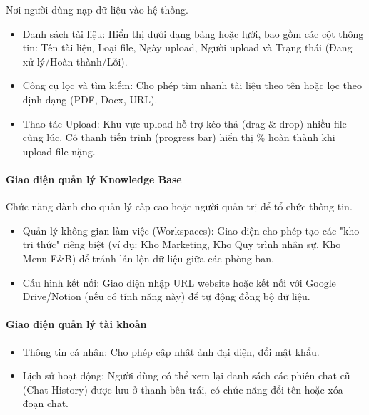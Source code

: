 Nơi người dùng nạp dữ liệu vào hệ thống.

\begin{itemize}
\item
  Danh sách tài liệu: Hiển thị dưới dạng bảng hoặc lưới, bao gồm các cột
  thông tin: Tên tài liệu, Loại file, Ngày upload, Người upload và Trạng
  thái (Đang xử lý/Hoàn thành/Lỗi).
\item
  Công cụ lọc và tìm kiếm: Cho phép tìm nhanh tài liệu theo tên hoặc lọc
  theo định dạng (PDF, Docx, URL).
\item
  Thao tác Upload: Khu vực upload hỗ trợ kéo-thả (drag \& drop) nhiều
  file cùng lúc. Có thanh tiến trình (progress bar) hiển thị \% hoàn
  thành khi upload file nặng.
\end{itemize}

\paragraph{Giao diện quản lý Knowledge
Base}\label{giao-diux1ec7n-quux1ea3n-luxfd-knowledge-base}

Chức năng dành cho quản lý cấp cao hoặc người quản trị để tổ chức thông
tin.

\begin{itemize}
\item
  Quản lý không gian làm việc (Workspaces): Giao diện cho phép tạo các
  "kho tri thức" riêng biệt (ví dụ: Kho Marketing, Kho Quy trình nhân
  sự, Kho Menu F\&B) để tránh lẫn lộn dữ liệu giữa các phòng ban.
\item
  Cấu hình kết nối: Giao diện nhập URL website hoặc kết nối với Google
  Drive/Notion (nếu có tính năng này) để tự động đồng bộ dữ liệu.
\end{itemize}

\paragraph{Giao diện quản lý tài
khoản}\label{giao-diux1ec7n-quux1ea3n-luxfd-tuxe0i-khoux1ea3n}

\begin{itemize}
\item
  Thông tin cá nhân: Cho phép cập nhật ảnh đại diện, đổi mật khẩu.
\item
  Lịch sử hoạt động: Người dùng có thể xem lại danh sách các phiên chat
  cũ (Chat History) được lưu ở thanh bên trái, có chức năng đổi tên hoặc
  xóa đoạn chat.
\end{itemize}

